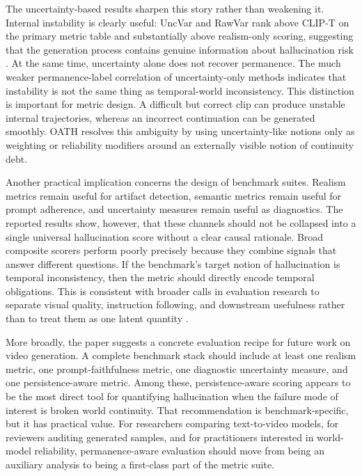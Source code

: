 \documentclass{article}
\begin{document}
The uncertainty-based results sharpen this story rather than weakening it. Internal instability is clearly useful: UncVar and RawVar rank above CLIP-T on the primary metric table and substantially above realism-only scoring, suggesting that the generation process contains genuine information about hallucination risk \cite{diffusion_uncertainty2024,self_consistency2023}. At the same time, uncertainty alone does not recover permanence. The much weaker permanence-label correlation of uncertainty-only methods indicates that instability is not the same thing as temporal-world inconsistency. This distinction is important for metric design. A difficult but correct clip can produce unstable internal trajectories, whereas an incorrect continuation can be generated smoothly. OATH resolves this ambiguity by using uncertainty-like notions only as weighting or reliability modifiers around an externally visible notion of continuity debt.

Another practical implication concerns the design of benchmark suites. Realism metrics remain useful for artifact detection, semantic metrics remain useful for prompt adherence, and uncertainty measures remain useful as diagnostics. The reported results show, however, that these channels should not be collapsed into a single universal hallucination score without a clear causal rationale. Broad composite scorers perform poorly precisely because they combine signals that answer different questions. If the benchmark's target notion of hallucination is temporal inconsistency, then the metric should directly encode temporal obligations. This is consistent with broader calls in evaluation research to separate visual quality, instruction following, and downstream usefulness rather than to treat them as one latent quantity \cite{vbench2024,videoscore2024,t2vcompbench2024}.

More broadly, the paper suggests a concrete evaluation recipe for future work on video generation. A complete benchmark stack should include at least one realism metric, one prompt-faithfulness metric, one diagnostic uncertainty measure, and one persistence-aware metric. Among these, persistence-aware scoring appears to be the most direct tool for quantifying hallucination when the failure mode of interest is broken world continuity. That recommendation is benchmark-specific, but it has practical value. For researchers comparing text-to-video models, for reviewers auditing generated samples, and for practitioners interested in world-model reliability, permanence-aware evaluation should move from being an auxiliary analysis to being a first-class part of the metric suite.
\end{document}
